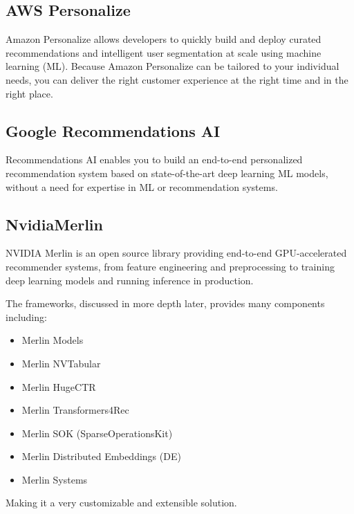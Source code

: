\subsection{AWS Personalize \cite{AWSPersonalize}}
Amazon Personalize allows developers to quickly build and deploy curated recommendations and intelligent user segmentation at scale using machine learning (ML). Because Amazon Personalize can be tailored to your individual needs, you can deliver the right customer experience at the right time and in the right place. \\

\subsection{Google Recommendations AI \cite{GoogleRecommendationsAI}}
Recommendations AI enables you to build an end-to-end personalized recommendation system based on state-of-the-art deep learning ML models, without a need for expertise in ML or recommendation systems. \\

\subsection{NvidiaMerlin \cite{NvidiaMerlin}}

NVIDIA Merlin is an open source library providing end-to-end GPU-accelerated recommender systems, from feature engineering and preprocessing to training deep learning models and running inference in production.

The frameworks, discussed in more depth later, provides many components including:

\begin{itemize}
    \item Merlin Models
    \item Merlin NVTabular
    \item Merlin HugeCTR
    \item Merlin Transformers4Rec
    \item Merlin SOK (SparseOperationsKit)
    \item Merlin Distributed Embeddings (DE)
    \item Merlin Systems
\end{itemize}

Making it a very customizable and extensible solution.

